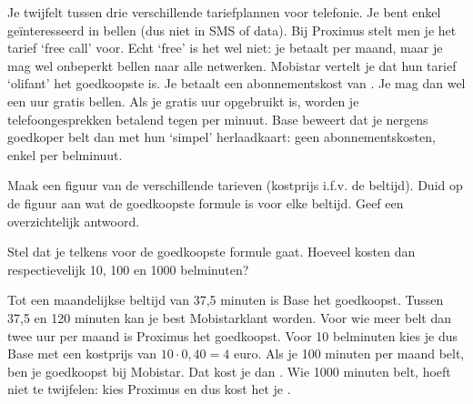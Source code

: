 \begin{oef}
Je twijfelt tussen drie verschillende tariefplannen voor telefonie. Je bent enkel geïnteresseerd in bellen (dus niet in SMS of data). Bij Proximus stelt men je het tarief `free call' voor. Echt `free' is het wel niet: je betaalt  per maand, maar je mag wel onbeperkt bellen naar alle netwerken. Mobistar vertelt je dat hun tarief `olifant' het goedkoopste is. Je betaalt een abonnementskost van . Je mag dan wel een uur gratis bellen. Als je gratis uur opgebruikt is, worden je telefoongesprekken betalend tegen  per minuut. Base beweert dat je nergens goedkoper belt dan met hun `simpel' herlaadkaart: geen abonnementskosten, enkel  per belminuut.

Maak een figuur van de verschillende tarieven (kostprijs i.f.v. de beltijd). Duid op de figuur aan wat de goedkoopste formule is voor elke beltijd. Geef een overzichtelijk antwoord.

Stel dat je telkens voor de goedkoopste formule gaat. Hoeveel kosten dan respectievelijk 10, 100 en 1000 belminuten?
\begin{opl}
Tot een maandelijkse beltijd van 37,5 minuten is Base het goedkoopst. Tussen 37,5 en 120 minuten kan je best Mobistarklant worden. Voor wie meer belt dan twee uur per maand is Proximus het goedkoopst. 
Voor 10 belminuten kies je dus Base met een kostprijs van $10\cdot 0,40=4$ euro. Als je 100 minuten per maand belt, ben je goedkoopst bij Mobistar. Dat kost je dan . Wie 1000 minuten belt, hoeft niet te twijfelen: kies Proximus en dus kost het je .
\end{opl}
\end{oef}

